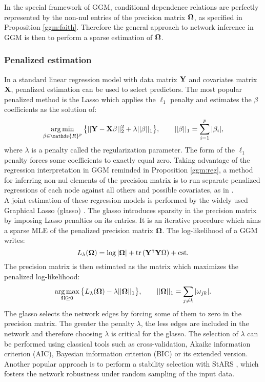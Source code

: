 In the special framework of GGM, conditional dependence relations are perfectly represented by the non-nul entries of the precision matrix ${\boldsymbol{\Omega}}$, as specified in Proposition \ref{ggm:faith}. Therefore the general approach to network inference in GGM is then to perform a sparse estimation of ${\boldsymbol{\Omega}}$.

 \subsubsection{Penalized estimation}
 In a standard linear regression model with data matrix ${\bf Y}$ and covariates matrix ${\bf X}$, penalized estimation can be used to select predictors. The most popular penalized method is the Lasso \citep{lasso} which applies the $\ell_1$ penalty and estimates the $\beta$ coefficients as the solution of:
 $$\argmin_{\beta \in \mathds{R}^p} \big\{ ||\Yb - \Xb\beta ||^2_2 + \lambda ||\beta||_1\big\}, \qquad ||\beta||_1=\sum_{i=1}^p |\beta_i|,$$
 where $\lambda$ is a penalty called the regularization parameter.  The form of the $\ell_1$ penalty forces some coefficients to exactly equal zero. Taking advantage of the regression interpretation in GGM reminded in Proposition \ref{ggm:reg}, a method for inferring non-nul elements of the precision matrix is to run separate penalized regressions of each node against all others and possible covariates, as in \citet{MeB06}. \\
 
 A joint estimation of these regression models is performed by the widely used Graphical Lasso (glasso) \citep{FHT08}. The glasso introduces sparsity in the precision matrix by imposing Lasso penalties on its entries. It is an iterative procedure which aims a sparse MLE of the penalized precision matrix ${\boldsymbol{\Omega}}$.  The log-likelihood of a GGM writes:
 $$L_\lambda({\boldsymbol{\Omega}}) = \log |{\boldsymbol{\Omega}}| +\rm tr\left( {\bf Y}^\intercal {\bf Y} {\boldsymbol{\Omega}} \right)+cst .$$
 The precision matrix is then estimated as the matrix which maximizes the penalized log-likelihood:
 $$\operatorname*{arg\,max}_{{\boldsymbol{\Omega}}\geq 0} \big\{L_\lambda({\boldsymbol{\Omega}}) - \lambda ||{\boldsymbol{\Omega}}||_1\big\}, \qquad ||{\boldsymbol{\Omega}}||_1 = \sum_{j\neq k} |\omega_{jk}|.$$
The glasso  selects the network edges by forcing some of them to zero in the precision matrix. The greater the penalty $\lambda$, the less edges are included in the network and therefore choosing $\lambda$ is critical for the glasso. The selection of $\lambda$ can be performed using classical tools such as cross-validation, Akaike information criterion (AIC),  Bayesian information criterion (BIC) or its extended version.  Another popular approach is to perform a stability selection with StARS \citep{stars}, which fosters the network robustness under random sampling of the input data.

